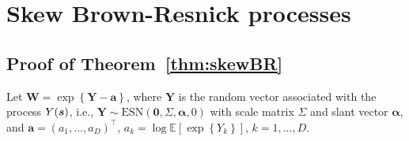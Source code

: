 \documentclass[12pt]{article}
\begin{document}
\section{Skew Brown-Resnick processes}
\label{sec:skew-log-normal_appendix}

\subsection{Proof of Theorem~\ref{thm:skewBR}}

Let $\bm W = \exp\left\{ \bm Y - \bm a \right\}$, where $\bm Y$ is the random vector associated with the process $Y({\boldsymbol{s}})$, i.e., $\bm Y \sim \text{ESN}(\bm 0,\Sigma,\bm\alpha,0)$ with scale matrix $\Sigma$ and slant vector $\bm \alpha$, and $\bm a = (a_1, \ldots, a_D)^\top$, $a_k=\log \mathbb E\left[\exp\left\{Y_k \right\}\right]$, $k=1, \ldots, D$. 
\end{document}
